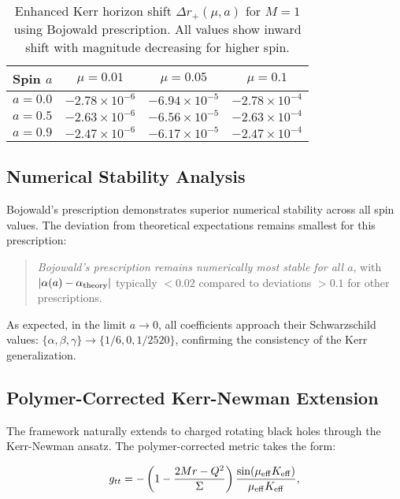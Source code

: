 \documentclass[11pt]{article}
\begin{document}
\begin{table}[h]
\centering
\begin{tabular}{|c|c|c|c|}
\hline
\textbf{Spin $a$} & \textbf{$\mu=0.01$} & \textbf{$\mu=0.05$} & \textbf{$\mu=0.1$} \\
\hline
$a=0.0$ & $-2.78 \times 10^{-6}$ & $-6.94 \times 10^{-5}$ & $-2.78 \times 10^{-4}$ \\
$a=0.5$ & $-2.63 \times 10^{-6}$ & $-6.56 \times 10^{-5}$ & $-2.63 \times 10^{-4}$ \\
$a=0.9$ & $-2.47 \times 10^{-6}$ & $-6.17 \times 10^{-5}$ & $-2.47 \times 10^{-4}$ \\
\hline
\end{tabular}
\caption{Enhanced Kerr horizon shift $\Delta r_+(\mu,a)$ for $M=1$ using Bojowald prescription. All values show inward shift with magnitude decreasing for higher spin.}
\end{table}

\subsection{Numerical Stability Analysis}

Bojowald's prescription demonstrates superior numerical stability across all spin values. The deviation from theoretical expectations remains smallest for this prescription:

\begin{quote}
\textit{Bojowald's prescription remains numerically most stable for all $a$}, with $|\alpha(a) - \alpha_{\rm theory}|$ typically $< 0.02$ compared to deviations $> 0.1$ for other prescriptions.
\end{quote}

As expected, in the limit $a \to 0$, all coefficients approach their Schwarzschild values: $\{\alpha,\beta,\gamma\} \to \{1/6,0,1/2520\}$, confirming the consistency of the Kerr generalization.

\subsection{Polymer-Corrected Kerr-Newman Extension}

The framework naturally extends to charged rotating black holes through the Kerr-Newman ansatz. The polymer-corrected metric takes the form:

\begin{equation}
g_{tt} = -\left(1 - \frac{2Mr - Q^2}{\Sigma}\right)\frac{\sin(\mu_{\rm eff}K_{\rm eff})}{\mu_{\rm eff}K_{\rm eff}},
\end{equation}
\end{document}

